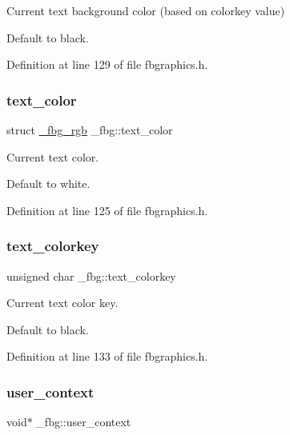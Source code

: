 Current text background color (based on colorkey value) 

Default to black. 

Definition at line 129 of file fbgraphics.\+h.

\mbox{\label{struct__fbg_a4abb858439598b09790ec6d5d8326bb2}} 
\subsubsection{\texorpdfstring{text\+\_\+color}{text\_color}}
{\footnotesize\ttfamily struct \mbox{\hyperlink{fbgraphics_8h_struct__fbg__rgb}{\+\_\+fbg\+\_\+rgb}} \+\_\+fbg\+::text\+\_\+color}



Current text color. 

Default to white. 

Definition at line 125 of file fbgraphics.\+h.

\mbox{\label{struct__fbg_a06e65293cf0b48e70d76d63f5de453e6}} 
\subsubsection{\texorpdfstring{text\+\_\+colorkey}{text\_colorkey}}
{\footnotesize\ttfamily unsigned char \+\_\+fbg\+::text\+\_\+colorkey}



Current text color key. 

Default to black. 

Definition at line 133 of file fbgraphics.\+h.

\mbox{\label{struct__fbg_ae3ecac18abee9dedabacaca9bb063bde}} 
\subsubsection{\texorpdfstring{user\+\_\+context}{user\_context}}
{\footnotesize\ttfamily void$\ast$ \+\_\+fbg\+::user\+\_\+context}



